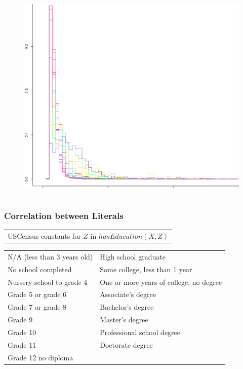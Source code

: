 \documentclass{beamer}
\begin{document}
\begin{frame}
\begin{columns}[c]
\begin{figure}
    \includegraphics[width=1\linewidth]{./Figures/income-education-zoom.png}
    \end{figure}
\end{columns}
\end{frame}
\begin{frame}
\frametitle{Correlation between Literals}
  \begin{table} 
    \begin{tabular}{c}
      USCensus constants for $Z$ in $hasEducation(X,Z)$\\
     \end{tabular}
     \begin{tabular}{l | l}
      \midrule
      N/A (less than 3 years old)	& High school graduate	\\
      No school completed		& Some college, less than 1 year\\
      Nursery school to grade 4   	& One or more years of college, no degree\\
      Grade 5 or grade 6		& Associate's degree\\
      Grade 7 or grade 8		& Bachelor's degree\\
      Grade 9				& Master's degree\\
      Grade 10                   	& Professional school degree\\
      Grade 11				& Doctorate degree\\  
      Grade 12 no diploma   		& \\
    \end{tabular}
  \end{table}
\end{frame}
\end{document}
